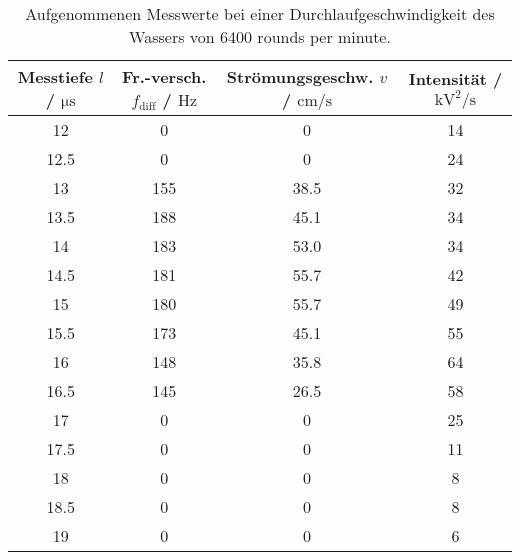 \begin{table}
  \centering
  \begin{tabular}{c | c | c | c}
    \toprule
    Messtiefe $l$ / $\si{\micro\second}$ & Fr.-versch. $f_{\mathrm{diff}}$ / $\si{\hertz}$ & Strömungsgeschw. $v$ / $\si{\centi\meter\per\second}$ & Intensität / $\si{\kilo\volt\squared\per\second}$ \\
    \midrule
    12          &    0      &     0          &     14\\
    12.5        &    0      &     0          &     24\\
    13          &    155    &     38.5       &     32\\
    13.5        &    188    &     45.1       &     34\\
    14          &    183    &     53.0       &     34\\
    14.5        &    181    &     55.7       &     42\\
    15          &    180    &     55.7       &     49\\
    15.5        &    173    &     45.1       &     55\\
    16          &    148    &     35.8       &     64\\
    16.5        &    145    &     26.5       &     58\\          
    17          &    0      &     0          &     25\\
    17.5        &    0     &      0          &     11\\
    18          &    0     &      0          &     8\\
    18.5        &    0     &      0          &     8\\
    19          &    0     &      0          &     6\\
    \bottomrule
  \end{tabular}
  \caption{Aufgenommenen Messwerte bei einer Durchlaufgeschwindigkeit des Wassers von 6400 rounds per minute.}
  \label{tab:Teil2_70}
\end{table}
